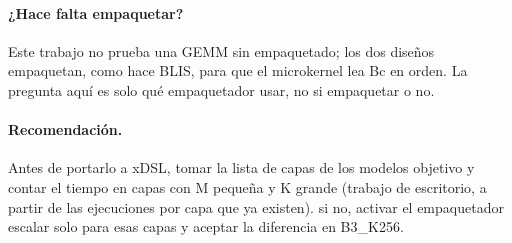 \paragraph{¿Hace falta empaquetar?} Este trabajo no prueba una GEMM sin empaquetado; los dos diseños empaquetan, como hace BLIS, para
que el microkernel lea Bc en orden. La pregunta aquí es solo qué empaquetador usar, no si empaquetar o no.

\paragraph{Recomendación.} Antes de portarlo a xDSL, tomar la lista de capas de los modelos objetivo y contar el tiempo en capas con
M pequeña y K grande (trabajo de escritorio, a partir de las ejecuciones por capa que ya existen).  si no, activar el empaquetador escalar solo para esas capas y aceptar la diferencia en B3\_K256.

